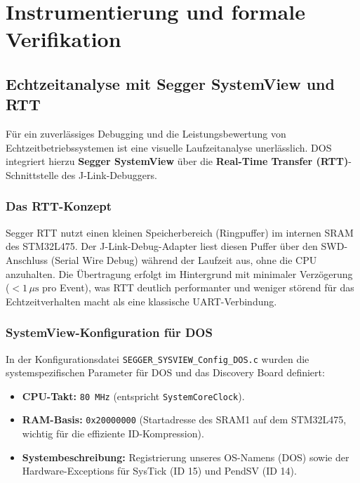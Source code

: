 \chapter{Instrumentierung und formale Verifikation}
\label{ch:verifikation}

\section{Echtzeitanalyse mit Segger SystemView und RTT}
Für ein zuverlässiges Debugging und die Leistungsbewertung von Echtzeitbetriebssystemen ist eine visuelle Laufzeitanalyse unerlässlich. DOS integriert hierzu \textbf{Segger SystemView} über die \textbf{Real-Time Transfer (RTT)}-Schnittstelle des J-Link-Debuggers.

\subsection{Das RTT-Konzept}
Segger RTT nutzt einen kleinen Speicherbereich (Ringpuffer) im internen SRAM des STM32L475. Der J-Link-Debug-Adapter liest diesen Puffer über den SWD-Anschluss (Serial Wire Debug) während der Laufzeit aus, ohne die CPU anzuhalten. Die Übertragung erfolgt im Hintergrund mit minimaler Verzögerung ($< 1\,\mu\text{s}$ pro Event), was RTT deutlich performanter und weniger störend für das Echtzeitverhalten macht als eine klassische UART-Verbindung.

\subsection{SystemView-Konfiguration für DOS}
In der Konfigurationsdatei \lstinline|SEGGER_SYSVIEW_Config_DOS.c| wurden die systemspezifischen Parameter für DOS und das Discovery Board definiert:
\begin{itemize}
    \item \textbf{CPU-Takt:} \lstinline|80 MHz| (entspricht \lstinline|SystemCoreClock|).
    \item \textbf{RAM-Basis:} \lstinline|0x20000000| (Startadresse des SRAM1 auf dem STM32L475, wichtig für die effiziente ID-Kompression).
    \item \textbf{Systembeschreibung:} Registrierung unseres OS-Namens (DOS) sowie der Hardware-Exceptions für SysTick (ID 15) und PendSV (ID 14).
\end{itemize}

